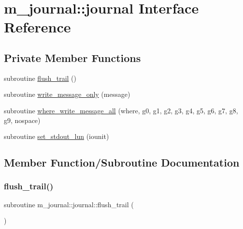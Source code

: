 \hypertarget{interfacem__journal_1_1journal}{}\section{m\+\_\+journal\+:\+:journal Interface Reference}
\label{interfacem__journal_1_1journal}
\subsection*{Private Member Functions}
\begin{DoxyCompactItemize}
\item 
subroutine \mbox{\hyperlink{interfacem__journal_1_1journal_acdde0ed4590797094f797514820e34fc}{flush\+\_\+trail}} ()
\item 
subroutine \mbox{\hyperlink{interfacem__journal_1_1journal_a1cb40f602a1e1c546bce71652a779d31}{write\+\_\+message\+\_\+only}} (message)
\item 
subroutine \mbox{\hyperlink{interfacem__journal_1_1journal_ae6136e918d4383d1c463c536a3eb814a}{where\+\_\+write\+\_\+message\+\_\+all}} (where, g0, g1, g2, g3, g4, g5, g6, g7, g8, g9, nospace)
\item 
subroutine \mbox{\hyperlink{interfacem__journal_1_1journal_a78f9c4a4314847963a2feae798ff54c1}{set\+\_\+stdout\+\_\+lun}} (iounit)
\end{DoxyCompactItemize}


\subsection{Member Function/\+Subroutine Documentation}
\mbox{\label{interfacem__journal_1_1journal_acdde0ed4590797094f797514820e34fc}} 
\subsubsection{\texorpdfstring{flush\+\_\+trail()}{flush\_trail()}}
{\footnotesize\ttfamily subroutine m\+\_\+journal\+::journal\+::flush\+\_\+trail (\begin{DoxyParamCaption}{ }\end{DoxyParamCaption})\hspace{0.3cm}{\ttfamily [private]}}

